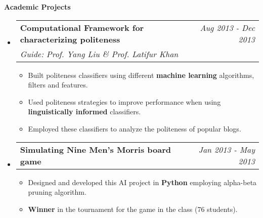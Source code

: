 \documentclass[letterpaper,11pt]{article}
\makeatletter
\newcommand{\resitem}[1]{\item[\ding{226}] #1 \vspace{-2pt}}
\newcommand{\resheading}[1]{{\large \colorbox{mygrey}{\begin{minipage}{\textwidth}{\textbf{#1 \vphantom{p\^{E}}}}\end{minipage}}}}
\newcommand{\ressubheading}[4]{
\begin{tabular*}{7.0in}{l@{\extracolsep{\fill}}r}
		\textbf{#1} & #2 \\
		\textit{#3} & \textit{#4} \\
\end{tabular*}\vspace{-6pt}}
\newcommand{\reslineheading}[2]{
\begin{tabular*}{7.0in}{l@{\extracolsep{\fill}}r}
		\textbf{#1} & #2 \\
\end{tabular*}\vspace{-6pt}}
\makeatother
\begin{document}
\resheading{Academic Projects}
\begin{itemize}


\item
	\ressubheading{Computational Framework for characterizing politeness}{\textit{Aug 2013 - Dec 2013}}{Guide: Prof. Yang Liu \& Prof. Latifur Khan}{}
	\begin{itemize}
		\resitem{Built politeness classifiers using different \textbf{machine learning} algorithms, filters and features.}
        \resitem{Used politeness strategies to improve performance when using \textbf{linguistically informed} classifiers.}
        \resitem{Employed these classifiers to analyze the politeness of popular blogs.}
	\end{itemize}

\item
	\reslineheading{Simulating Nine Men's Morris board game}{\textit{Jan 2013 - May 2013}}
	\begin{itemize}
		\resitem{Designed and developed this AI project in \textbf{Python} employing alpha-beta pruning algorithm.}
		\resitem{\textbf{Winner} in the tournament for the game in the class (76 students).}
	\end{itemize}



\end{itemize}
\end{document}
